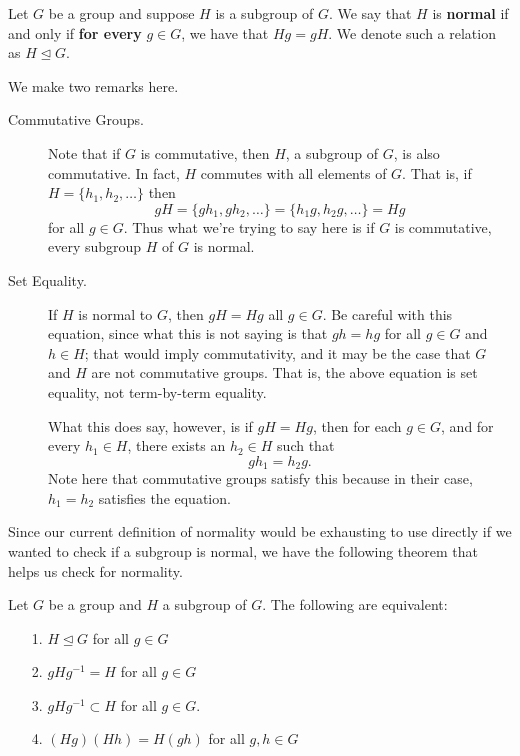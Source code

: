 \documentclass[12pt,letterpaper]{algebra_book}
\newcommand{\normal}{\unlhd}
\theoremstyle{definition}
\begin{document}
    \begin{definition}
        Let $G$ be a group and suppose $H$ is a subgroup of $G$. We
        say that $H$ is \textbf{normal} if and only if \textbf{for every} $g
        \in G$, we have that $Hg = gH$. We denote such a relation as
        $H \unlhd G$.
    \end{definition}
    \noindent We make two remarks here.
    \begin{description}
        \item[Commutative Groups.] 
         
        Note that if $G$ is commutative, then $H$, a subgroup of $G$, is
        also commutative. In fact, $H$ commutes with all elements of $G$.
        That is, if $H = \{h_1, h_2, \dots \}$ then
        \[
            gH = \{gh_1, gh_2, \dots\} = \{h_1g, h_2g, \dots\} = Hg
        \]
        for all $g \in G$. Thus what we're trying to say here is if $G$ is commutative, every
        subgroup $H$ of $G$ is normal.

        \item[Set Equality.] If $H$ is normal to $G$, then $gH = Hg$
    all $g \in G$. Be careful with this equation, since what this is
    not saying is that $gh=hg$ for all $g\in G$ and $h \in H$; that
    would imply commutativity, and it may be the case that $G$ and $H$
    are not commutative groups. That is, the above equation is set
    equality, not term-by-term equality.

    What this does say, however, is if $gH = Hg$, then for each $g\in
    G$, and for every $h_1 \in H$, there exists an $h_2 \in H$ such
    that 
    \[
        gh_1 = h_2g.
    \]
    Note here that commutative groups satisfy this because in their
    case, $h_1 = h_2$ satisfies the equation. 
    \end{description}

    Since our current definition of normality would be exhausting to
    use directly if we wanted to check if a subgroup is normal, we
    have the following theorem that helps us check for normality. 

    \begin{thm}
        Let $G$ be a group and $H$ a subgroup of $G$. The following
        are equivalent:
        \begin{itemize}
            \item[1.] $H \normal G$ for all $g \in G$
            \item[2.] $gHg^{-1} = H$ for all $g \in G$
            \item[3.] $gHg^{-1} \subset H$ for all $g\in G$.
            \item[4.] $(Hg)(Hh) = H(gh)$ for all $g, h \in G$
        \end{itemize}
    \end{thm}
\end{document}
